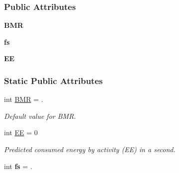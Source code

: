 \subsubsection*{Public Attributes}
\begin{DoxyCompactItemize}
\item 
\hypertarget{classactivity_detection_1_1_activity_detection_ac059a8775de7bbdd7e4e5d5d5bf8d238}{{\bfseries B\-M\-R}}\label{classactivity_detection_1_1_activity_detection_ac059a8775de7bbdd7e4e5d5d5bf8d238}

\item 
\hypertarget{classactivity_detection_1_1_activity_detection_a27126ac10d1900ab3eb87f4e0bfc1811}{{\bfseries fs}}\label{classactivity_detection_1_1_activity_detection_a27126ac10d1900ab3eb87f4e0bfc1811}

\item 
\hypertarget{classactivity_detection_1_1_activity_detection_a08d4f14a05d0a9c66e19463bdaa5c668}{{\bfseries E\-E}}\label{classactivity_detection_1_1_activity_detection_a08d4f14a05d0a9c66e19463bdaa5c668}

\end{DoxyCompactItemize}
\subsubsection*{Static Public Attributes}
\begin{DoxyCompactItemize}
\item 
int \hyperlink{classactivity_detection_1_1_activity_detection_a7a2350bfa80449984efa3e5ae313a29c}{B\-M\-R} = .
\begin{DoxyCompactList}\small\item\em Default value for B\-M\-R. \end{DoxyCompactList}\item 
int \hyperlink{classactivity_detection_1_1_activity_detection_a1a2a17f907231e0ea52ab41de3aa54ed}{E\-E} = 0
\begin{DoxyCompactList}\small\item\em Predicted consumed energy by activity (E\-E) in a second. \end{DoxyCompactList}\item 
\hypertarget{classactivity_detection_1_1_activity_detection_a9480289ea33b66524afd3fc17c931bc8}{int {\bfseries fs} = .}\label{classactivity_detection_1_1_activity_detection_a9480289ea33b66524afd3fc17c931bc8}

\end{DoxyCompactItemize}


